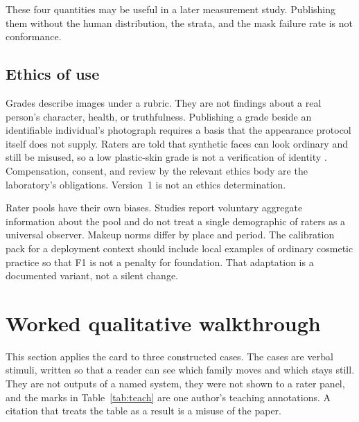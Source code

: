 \documentclass[10pt,twocolumn]{article}
\begin{document}
These four quantities may be useful in a later measurement study. Publishing them without the human distribution, the strata, and the mask failure rate is not conformance.

\subsection{Ethics of use}

Grades describe images under a rubric. They are not findings about a real person's character, health, or truthfulness. Publishing a grade beside an identifiable individual's photograph requires a basis that the appearance protocol itself does not supply. Raters are told that synthetic faces can look ordinary and still be misused, so a low plastic-skin grade is not a verification of identity \cite{nightingale2022}. Compensation, consent, and review by the relevant ethics body are the laboratory's obligations. Version~1 is not an ethics determination.

Rater pools have their own biases. Studies report voluntary aggregate information about the pool and do not treat a single demographic of raters as a universal observer. Makeup norms differ by place and period. The calibration pack for a deployment context should include local examples of ordinary cosmetic practice so that F1 is not a penalty for foundation. That adaptation is a documented variant, not a silent change.

\section{Worked qualitative walkthrough}
\label{sec:walk}

This section applies the card to three constructed cases. The cases are verbal stimuli, written so that a reader can see which family moves and which stays still. They are not outputs of a named system, they were not shown to a rater panel, and the marks in Table~\ref{tab:teach} are one author's teaching annotations. A citation that treats the table as a result is a misuse of the paper.
\end{document}
